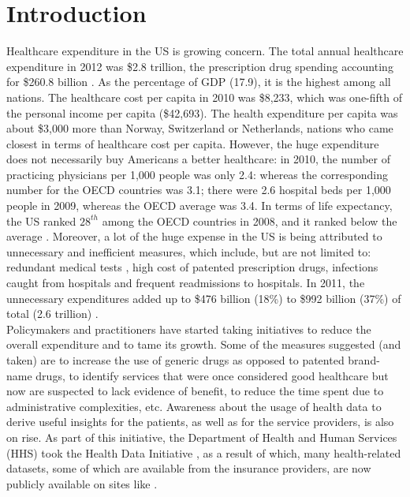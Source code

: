 \section{Introduction}
\label{sec:introduction}
Healthcare expenditure in the US is growing concern. The total annual healthcare expenditure in 2012 was \$2.8 trillion, the prescription drug spending accounting for \$260.8 billion \cite{healthaffairs}. As the percentage of GDP (17.9), it is the highest among all nations. The healthcare cost per capita in 2010 was \$8,233, which was one-fifth of the personal income per capita (\$42,693). The health expenditure per capita was about \$3,000 more than Norway, Switzerland or Netherlands, nations who came closest \cite{countrycomp} in terms of healthcare cost per capita. However, the huge expenditure does not necessarily buy Americans a better healthcare: in 2010, the number of practicing physicians per 1,000 people was only 2.4: whereas the corresponding number for the OECD countries was 3.1; there were 2.6 hospital beds per 1,000 people in 2009, whereas the OECD average was 3.4. In terms of life expectancy, the US ranked $28^{th}$ among the OECD countries in 2008, and it ranked below the average \cite{lifeex}. Moreover, a lot of the huge expense in the US is being attributed to unnecessary and inefficient measures, which include, but are not limited to: redundant medical tests \cite{seattle}, high cost of patented prescription drugs, infections caught from hospitals and frequent readmissions to hospitals. In 2011, the unnecessary expenditures added up to \$476 billion (18\%) to \$992 billion (37\%) of total (2.6 trillion) \cite{unnecessary}.\\

Policymakers and practitioners have started taking initiatives to reduce the overall expenditure and to tame its growth. Some of the measures suggested (and taken) are to increase the use of generic drugs as opposed to patented brand-name drugs, to identify services that were once considered good healthcare but now are suspected to lack evidence of benefit, to reduce the time spent due to administrative complexities, etc. Awareness about the usage of health data to derive useful insights for the patients, as well as for the service providers, is also on rise. As part of this initiative, the    
Department of Health and Human Services (HHS) took the Health Data Initiative \cite{hdi}, as a result of which, many health-related datasets, some of which are available from the insurance providers, are now publicly available on sites like \cite{healthdata}.\\

